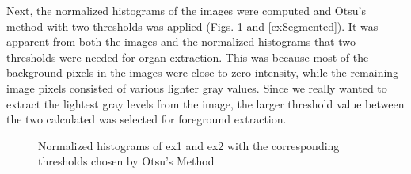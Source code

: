 \documentclass{article}[12 pt]
\begin{document}
\noindent
Next, the normalized histograms of the images were computed and Otsu's method with two thresholds was applied (Figs. \ref{exHists} and \ref{exSegmented}). It was apparent from both the images and the normalized histograms that two thresholds were needed for organ extraction.  This was because most of the background pixels in the images were close to zero intensity, while the remaining image pixels consisted of various lighter gray values.  Since we really wanted to extract the lightest gray levels from the image, the larger threshold value between the two calculated was selected for foreground extraction.

\begin{figure}[H]
\captionsetup[subfloat]{labelformat=empty}
\centering
{} 
\caption{Normalized histograms of ex1 and ex2 with the corresponding thresholds chosen by Otsu's Method}
\label{exHists}
\end{figure}
\end{document}
